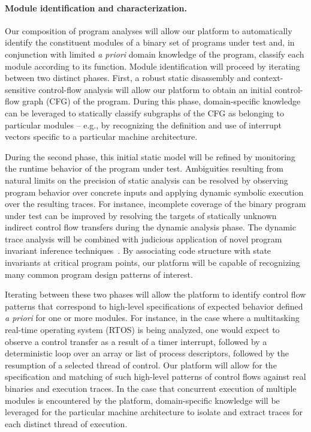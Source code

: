 \documentclass[letterpaper,twoside,11pt,headings=small]{scrartcl}
\begin{document}
\paragraph{Module identification and characterization.} Our composition of
program analyses will allow our platform to automatically identify the
constituent modules of a binary set of programs under test and, in conjunction
with limited \emph{a priori} domain knowledge of the program, classify each
module according to its function.  Module identification will proceed by
iterating between two distinct phases. First, a robust static disassembly and
context-sensitive control-flow analysis will allow our platform to obtain an
initial control-flow graph (CFG) of the program. During this phase,
domain-specific knowledge can be leveraged to statically classify subgraphs of
the CFG as belonging to particular modules -- e.g., by recognizing the
definition and use of interrupt vectors specific to a particular machine
architecture.

During the second phase, this initial static model will be refined by
monitoring the runtime behavior of the program under test.  Ambiguities
resulting from natural limits on the precision of static analysis can be
resolved by observing program behavior over concrete inputs and applying
dynamic symbolic execution over the resulting traces.  For instance,
incomplete coverage of the binary program under test can be improved by
resolving the targets of statically unknown indirect control flow transfers
during the dynamic analysis phase.  The dynamic trace analysis will be
combined with judicious application of novel program invariant inference
techniques~\cite{ernst:2009:daikon,csallner:icse2008:dysy,krka:icsa2010:inference}.
By associating code structure with state invariants at critical program
points, our platform will be capable of recognizing many common program design
patterns of interest.

Iterating between these two phases will allow the platform to identify control
flow patterns that correspond to high-level specifications of expected
behavior defined \emph{a priori} for one or more modules.  For instance, in
the case where a multitasking real-time operating system (RTOS) is being
analyzed, one would expect to observe a control transfer as a result of a
timer interrupt, followed by a deterministic loop over an array or list of
process descriptors, followed by the resumption of a selected thread of
control.  Our platform will allow for the specification and matching of such
high-level patterns of control flows against real binaries and execution
traces.  In the case that concurrent execution of multiple modules is
encountered by the platform, domain-specific knowledge will be leveraged for
the particular machine architecture to isolate and extract traces for each
distinct thread of execution.
\end{document}
